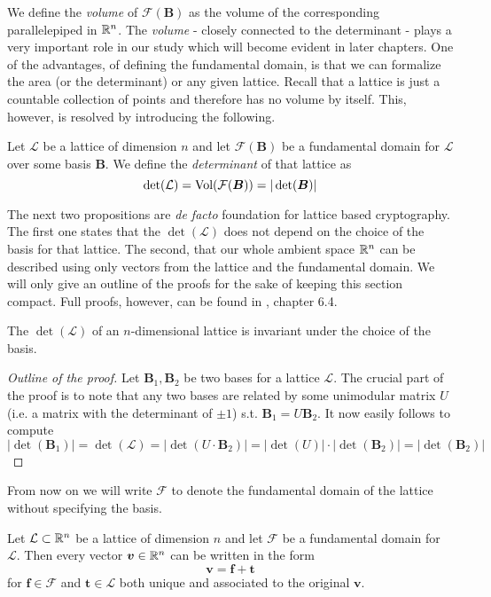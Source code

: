 We define the \textit{volume} of $\mathcal{F}(\bm{B})$ as the volume of the corresponding parallelepiped in $\mathbb{R}^n$. The \textit{volume} - closely connected to the determinant - plays a very important role in our study which will become evident in later chapters. One of the advantages, of defining the fundamental domain, is that we can formalize the area (or the determinant) or any given lattice. Recall that a lattice is just a countable collection of points and therefore has no volume by itself. This, however, is resolved by introducing the following.

\begin{definition}
    Let $\mathcal{L}$ be a lattice of dimension $n$ and let $\mathcal{F}(\bm{B})$ be a fundamental domain for $\mathcal{L}$ over some basis $\bm{B}$. We define the \textit{determinant} of that lattice as
    $$ \det (\mathcal{L}) = \text{Vol}(\mathcal{F(\boldsymbol{B})}) = |\det (\boldsymbol{B}) |$$
\end{definition}

The next two propositions are \textit{de facto} foundation for lattice based cryptography. The first one states that the $\det (\mathcal{L})$ does not depend on the choice of the basis for that lattice. The second, that our whole ambient space $\mathbb{R}^n$ can be described using only vectors from the lattice and the fundamental domain. We will only give an outline of the proofs for the sake of keeping this section compact. Full proofs, however, can be found in \cite{book}, chapter 6.4.

\begin{proposition}
    The $\det (\mathcal{L})$ of an $n$-dimensional lattice is invariant under the choice of the basis.
\end{proposition}

\begin{proof}[Outline of the proof]
    Let $\bm{B}_1, \bm{B}_2$ be two bases for a lattice $\mathcal{L}$. The crucial part of the proof is to note that any two bases are related by some unimodular matrix $U$ (i.e. a matrix with the determinant of $\pm 1$) s.t. $\bm{B}_1 = U \bm{B}_2$. It now easily follows to compute $| \det (\bm{B}_1) | = \det (\mathcal{L}) = | \det (U \cdot \bm{B}_2) | = | \det(U) | \cdot | \det(\bm{B}_2) | = | \det(\bm{B}_2)|$ 
\end{proof}

From now on we will write $\mathcal{F}$ to denote the fundamental domain of the lattice without specifying the basis.

\begin{proposition}
    Let $\mathcal{L} \subset \mathbb{R}^n$ be a lattice of dimension $n$ and let $\mathcal{F}$ be a fundamental domain for $\mathcal{L}$. Then every vector $\boldsymbol{v} \in \mathbb{R}^n$ can be written in the form 
    $$\bm{v} = \bm{f} + \bm{t}$$
    for $\bm{f} \in \mathcal{F}$ and $\bm{t} \in \mathcal{L}$ both unique and associated to the original $\bm{v}$.
\end{proposition}

